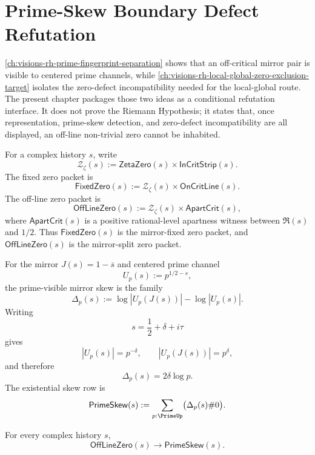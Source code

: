 \chapter{Prime-Skew Boundary Defect Refutation}
\label{ch:visions-rh-prime-skew-boundary-defect-refutation}

\autoref{ch:visions-rh-prime-fingerprint-separation} shows that an
off-critical mirror pair is visible to centered prime channels, while
\autoref{ch:visions-rh-local-global-zero-exclusion-target} isolates the
zero-defect incompatibility needed for the local-global route. The present
chapter packages those two ideas as a conditional refutation interface. It
does not prove the Riemann Hypothesis; it states that, once representation,
prime-skew detection, and zero-defect incompatibility are all displayed, an
off-line non-trivial zero cannot be inhabited.

\begin{definition}
\label{def:rh-prime-skew-nontrivial-offline-zero}
For a complex history $s$, write
$$
\mathcal Z_{\zeta}(s)
:=
\mathsf{ZetaZero}(s)\times\mathsf{InCritStrip}(s).
$$
The fixed zero packet is
$$
\mathsf{FixedZero}(s)
:=
\mathcal Z_{\zeta}(s)\times\mathsf{OnCritLine}(s).
$$
The off-line zero packet is
$$
\mathsf{OffLineZero}(s)
:=
\mathcal Z_{\zeta}(s)\times\mathsf{ApartCrit}(s),
$$
where $\mathsf{ApartCrit}(s)$ is a positive rational-level apartness
witness between $\Re(s)$ and $1/2$. Thus
$\mathsf{FixedZero}(s)$ is the mirror-fixed zero packet, and
$\mathsf{OffLineZero}(s)$ is the mirror-split zero packet.
\end{definition}

\begin{definition}
\label{def:rh-prime-visible-mirror-skew}
For the mirror $J(s)=1-\overline{s}$ and centered prime channel
$$
U_p(s):=p^{1/2-s},
$$
the prime-visible mirror skew is the family
$$
\Delta_p(s)
:=
\log |U_p(J(s))|-\log |U_p(s)|.
$$
Writing
$$
s=\frac12+\delta+i\tau
$$
gives
$$
|U_p(s)|=p^{-\delta},
\qquad
|U_p(J(s))|=p^\delta,
$$
and therefore
$$
\Delta_p(s)=2\delta\log p.
$$
The existential skew row is
$$
\mathsf{PrimeSkew}(s)
:=
\sum_{p:\PrimeUp}\bigl(\Delta_p(s)\#0\bigr).
$$
\end{definition}

\begin{lemma}
\label{lem:rh-offline-zero-produces-prime-visible-skew}
For every complex history $s$,
$$
\mathsf{OffLineZero}(s)\to\mathsf{PrimeSkew}(s).
$$
\end{lemma}

